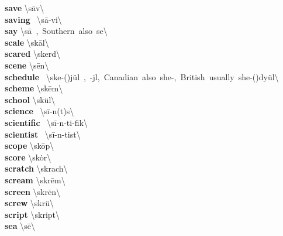 \documentclass[10pt,a4paper]{article}
\begin{document}
\begin{multicols}{2}
\textbf{ save }\quad \textbackslash \textprimstress s\={a}v\textbackslash \\
\textbf{ saving }\quad \ \textbackslash \textprimstress s\={a}-vi\engma \textbackslash \\
\textbf{ say }\quad \textbackslash \textprimstress s\={a}\ ,\ Southern\ also\ \textprimstress se\textbackslash \\
\textbf{ scale }\quad \textbackslash \textprimstress sk\={a}l\textbackslash \\
\textbf{ scared }\quad \textbackslash \textprimstress skerd\textbackslash \\
\textbf{ scene }\quad \textbackslash \textprimstress s\={e}n\textbackslash \\
\textbf{ schedule }\quad \ \textbackslash \textprimstress ske-(\textsecstress )j\"{u}l\ ,\ -j\textschwa l,\ Canadian\ also\ \textprimstress she-,\ British\ usually\ \textprimstress she-(\textsecstress )dy\"{u}l\textbackslash \\
\textbf{ scheme }\quad \textbackslash \textprimstress sk\={e}m\textbackslash \\
\textbf{ school }\quad \textbackslash \textprimstress sk\"{u}l\textbackslash \\
\textbf{ science }\quad \ \textbackslash \textprimstress s\={i}-\textschwa n(t)s\textbackslash \\
\textbf{ scientific }\quad \ \textbackslash \textsecstress s\={i}-\textschwa n-\textprimstress ti-fik\textbackslash \\
\textbf{ scientist }\quad \ \textbackslash \textprimstress s\={i}-\textschwa n-tist\textbackslash \\
\textbf{ scope }\quad \textbackslash \textprimstress sk\={o}p\textbackslash \\
\textbf{ score }\quad \textbackslash \textprimstress sk\.{o}r\textbackslash \\
\textbf{ scratch }\quad \textbackslash \textprimstress skrach\textbackslash \\
\textbf{ scream }\quad \textbackslash \textprimstress skr\={e}m\textbackslash \\
\textbf{ screen }\quad \textbackslash \textprimstress skr\={e}n\textbackslash \\
\textbf{ screw }\quad \textbackslash \textprimstress skr\"{u}\textbackslash \\
\textbf{ script }\quad \textbackslash \textprimstress skript\textbackslash \\
\textbf{ sea }\quad \textbackslash \textprimstress s\={e}\textbackslash \\

\end{multicols}
\end{document}
